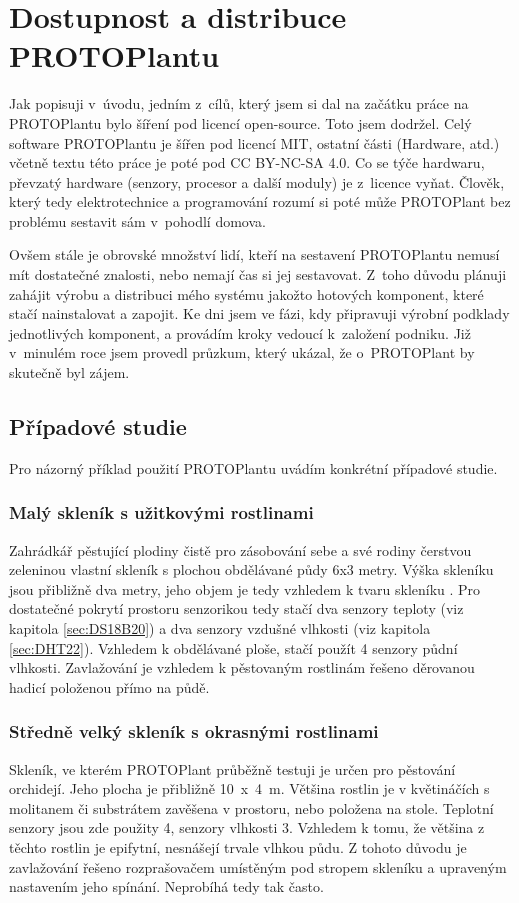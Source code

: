\chapter{Dostupnost a distribuce PROTOPlantu}
Jak popisuji v~úvodu, jedním z~cílů, který jsem si dal na začátku práce na PROTOPlantu bylo šíření pod licencí open-source.
Toto jsem dodržel. 
Celý software PROTOPlantu je šířen pod licencí MIT, ostatní části (Hardware, atd.) včetně textu této práce je poté pod CC BY-NC-SA 4.0.
Co se týče hardwaru, převzatý hardware (senzory, procesor a další moduly) je z~licence vyňat.
Člověk, který tedy elektrotechnice a programování rozumí si poté může PROTOPlant bez problému sestavit sám v~pohodlí domova.

Ovšem stále je obrovské množství lidí, kteří na sestavení PROTOPlantu nemusí mít dostatečné znalosti, nebo nemají čas si jej sestavovat.
Z~toho důvodu plánuji zahájit výrobu a distribuci mého systému jakožto hotových komponent, které stačí nainstalovat a zapojit.
Ke dni  jsem ve fázi, kdy připravuji výrobní podklady jednotlivých komponent, a provádím kroky vedoucí k~založení podniku.
Již v~minulém roce jsem provedl průzkum, který ukázal, že o~PROTOPlant by skutečně byl zájem.

\section{Případové studie}
Pro názorný příklad použití PROTOPlantu uvádím konkrétní případové studie.

\subsection{Malý skleník s užitkovými rostlinami}
Zahrádkář pěstující plodiny čistě pro zásobování sebe a své rodiny čerstvou zeleninou vlastní skleník s plochou obdělávané půdy 6x3 metry.
Výška skleníku jsou přibližně dva metry, jeho objem je tedy vzhledem k tvaru skleníku .
Pro dostatečné pokrytí prostoru senzorikou tedy stačí dva senzory teploty (viz kapitola \ref{sec:DS18B20}) a dva senzory vzdušné vlhkosti (viz kapitola \ref{sec:DHT22}). 
Vzhledem k obdělávané ploše, stačí použít 4 senzory půdní vlhkosti.
Zavlažování je vzhledem k pěstovaným rostlinám řešeno děrovanou hadicí položenou přímo na půdě.


\subsection{Středně velký skleník s okrasnými rostlinami}
Skleník, ve kterém PROTOPlant průběžně testuji je určen pro pěstování orchidejí. 
Jeho plocha je přibližně 10~x~4~m.
Většina rostlin je v květináčích s molitanem či substrátem zavěšena v prostoru, nebo položena na stole.
Teplotní senzory jsou zde použity 4, senzory vlhkosti 3.
Vzhledem k tomu, že většina z těchto rostlin je epifytní, nesnášejí trvale vlhkou půdu. 
Z tohoto důvodu je zavlažování řešeno rozprašovačem umístěným pod stropem skleníku a upraveným nastavením jeho spínání.
Neprobíhá tedy tak často.

